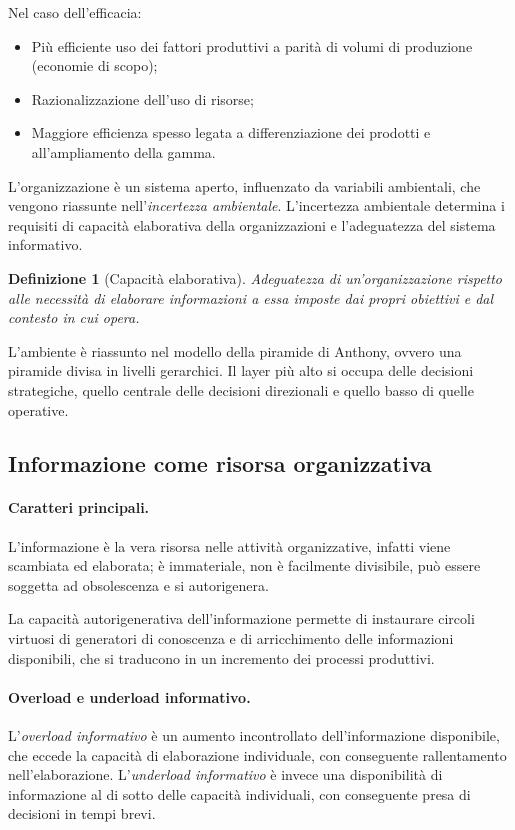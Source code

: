\documentclass[a4paper, 11pt]{article}
\newtheorem{definit}{Definizione}[subsection]
\begin{document}
	Nel caso dell'efficacia: \begin{itemize}
		\item Più efficiente uso dei fattori produttivi a parità di volumi di produzione (economie di scopo);
		\item Razionalizzazione dell'uso di risorse;
		\item Maggiore efficienza spesso legata a differenziazione dei prodotti e all’ampliamento della gamma.
	\end{itemize}
	
	L'organizzazione è un sistema aperto, influenzato da variabili ambientali, che vengono riassunte nell'\textit{incertezza ambientale}.
	L'incertezza ambientale determina i requisiti di capacità elaborativa della organizzazioni e l'adeguatezza del sistema informativo.
	
	\begin{definit}[Capacità elaborativa]
		Adeguatezza di un’organizzazione rispetto alle necessità di elaborare informazioni a essa imposte dai propri obiettivi e dal contesto in cui opera.
	\end{definit}
	
	L'ambiente è riassunto nel modello della piramide di Anthony, ovvero una piramide divisa in livelli gerarchici.
	Il layer più alto si occupa delle decisioni strategiche, quello centrale delle decisioni direzionali e quello basso di quelle operative.
	
	
	
	\subsection{Informazione come risorsa organizzativa}
	\paragraph{Caratteri principali.} L'informazione è la vera risorsa nelle attività organizzative, infatti viene scambiata ed elaborata; è immateriale, non è facilmente divisibile, può essere soggetta ad obsolescenza e si autorigenera.
	
	La capacità autorigenerativa dell'informazione permette di instaurare circoli virtuosi di generatori di conoscenza e di arricchimento delle informazioni disponibili, che si traducono in un incremento dei processi produttivi.
	
	\paragraph{Overload e underload informativo.} L'\textit{overload informativo} è un aumento incontrollato dell'informazione disponibile, che eccede la capacità di elaborazione individuale, con conseguente rallentamento nell'elaborazione. L'\textit{underload informativo} è invece una disponibilità di informazione al di sotto delle capacità individuali, con conseguente presa di decisioni in tempi brevi.
	
\end{document}
